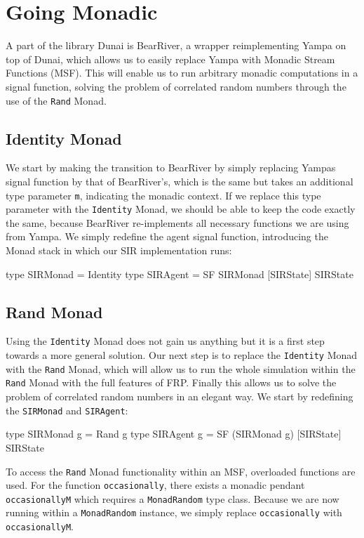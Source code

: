 \section{Going Monadic}
\label{sec:timedriven_monadic}
A part of the library Dunai is BearRiver, a wrapper reimplementing Yampa on top of Dunai, which allows us to easily replace Yampa with Monadic Stream Functions (MSF). This will enable us to run arbitrary monadic computations in a signal function, solving the problem of correlated random numbers through the use of the \texttt{Rand} Monad.

\subsection{Identity Monad}
We start by making the transition to BearRiver by simply replacing Yampas signal function by that of BearRiver's, which is the same but takes an additional type parameter \texttt{m}, indicating the monadic context. If we replace this type parameter with the \texttt{Identity} Monad, we should be able to keep the code exactly the same, because BearRiver re-implements all necessary functions we are using from Yampa. We simply redefine the agent signal function, introducing the Monad stack in which our SIR implementation runs:

\begin{HaskellCode}
type SIRMonad = Identity
type SIRAgent = SF SIRMonad [SIRState] SIRState
\end{HaskellCode}

\subsection{Rand Monad}
Using the \texttt{Identity} Monad does not gain us anything but it is a first step towards a more general solution. Our next step is to replace the \texttt{Identity} Monad with the \texttt{Rand} Monad, which will allow us to run the whole simulation within the \texttt{Rand} Monad with the full features of FRP. Finally this allows us to solve the problem of correlated random numbers in an elegant way. We start by redefining the \texttt{SIRMonad} and \texttt{SIRAgent}:

\begin{HaskellCode}
type SIRMonad g = Rand g
type SIRAgent g = SF (SIRMonad g) [SIRState] SIRState
\end{HaskellCode}

To access the \texttt{Rand} Monad functionality within an MSF, overloaded functions are used. For the function \texttt{occasionally}, there exists a monadic pendant \texttt{occasionallyM} which requires a \texttt{MonadRandom} type class. Because we are now running within a \texttt{MonadRandom} instance, we simply replace \texttt{occasionally} with \texttt{occasionallyM}. 


